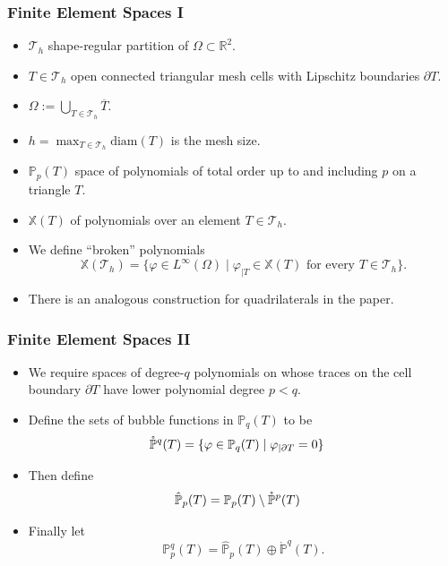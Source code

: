 \documentclass[aspectratio=169,xcolor=dvipsnames,11pt]{beamer}
\begin{document}
\begin{frame}\frametitle{Finite Element Spaces I}
\begin{itemize}
\item $\mathcal{T}_h$ shape-regular partition of $\Omega \subset \mathbb{R}^2$.
\item $T \in \mathcal{T}_h$ open connected triangular mesh cells with Lipschitz boundaries $\partial T$.
\item  $\Omega := \bigcup_{T \in \mathcal{T}_h} \overline{T}$.
\item $h = \max_{T\in\mathcal{T}_h} \mathrm{diam}(T)$ is the mesh size.
\item $\mathbb{P}_{p}(T)$  space of polynomials of total order up to and including $p$ on a triangle $T$.
\item $\mathbb{X}(T)$ of polynomials over an element $T \in \mathcal{T}_h$.
\item We define ``broken'' polynomials 
\[
\mathbb{X}(\mathcal{T}_h) = \{\varphi \in L^\infty(\Omega) \mid \varphi_{|T} \in \mathbb{X}(T) \text{~for every~} T \in \mathcal{T}_h\}.
\]
\item \pause There is an analogous construction for quadrilaterals in the paper.
\end{itemize}

\end{frame}

\begin{frame}\frametitle{Finite Element Spaces II}
\begin{itemize}
\item We require spaces of degree-$q$ polynomials on whose traces on the cell boundary $\partial T$ have lower polynomial degree $p < q$.
\item Define the sets of bubble functions in $\mathbb{P}_{q}(T)$
 to be 
\[
\aligned
\mathring{\mathbb{P}}^{q}(T) &= \{ \varphi \in \mathbb{P}_{q}(T) \mid \varphi_{|\partial T} =  0\}%
\endaligned
\]
\item Then define 
\[
\aligned
\hat{\mathbb{P}}_{p}(T) &= \mathbb{P}_{p}(T) \setminus \mathring{\mathbb{P}}^{p}(T)%
\endaligned
\]
\item Finally
let
\begin{equation}
	\mathbb{P}_p^q(T) = \hat{\mathbb{P}}_{p}(T) \oplus \mathring{\mathbb{P}}^{q}(T).
\end{equation}
\end{itemize}
\end{frame}
\end{document}
